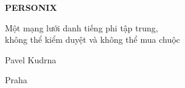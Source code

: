 \thispagestyle{empty}
\begin{center}
  {\sffamily\bfseries\fontsize{34}{40}\selectfont PERSONIX\par}
  \vspace{2.2em}
  {\rmfamily\large Một mạng lưới danh tiếng phi tập trung,\\[0.25em]
   không thể kiểm duyệt và không thể mua chuộc\par}
\end{center}
\begin{center}
  {\rmfamily\Large Pavel Kudrna\par}
  \vspace{0.45em}
  {\rmfamily\small Praha\quad\textbullet{}\par}
\end{center}
\clearpage
